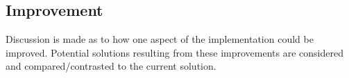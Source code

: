 \subsection{Improvement}
Discussion is made as to how one aspect of the implementation could be improved. Potential solutions resulting from these improvements are considered and compared/contrasted to the current solution.
